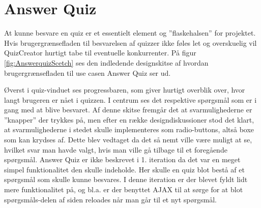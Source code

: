 \section{Answer Quiz}

At kunne besvare en quiz er et essentielt element og ''flaskehalsen'' for projektet. Hvis brugergrænsefladen til besvarelsen af quizzer ikke føles let og overskuelig vil QuizCreator hurtigt tabe til eventuelle konkurrenter. På figur \ref{fig:AnswerquizScetch} ses den indledende designskitse af hvordan brugergrænsefladen til use casen Answer Quiz ser ud.


Øverst i quiz-vinduet ses progressbaren, som giver hurtigt overblik over, hvor langt brugeren er nået i quizzen. I centrum ses det respektive spørgsmål som er i gang med at blive besvaret. Af denne skitse fremgår det at svarmulighederne er ''knapper'' der trykkes på, men efter en række designdiskussioner stod det klart, at svarmulighederne i stedet skulle implementeres som radio-buttons, altså boxe som kan krydses af. Dette blev vedtaget da det så nemt ville være muligt at se, hvilket svar man havde valgt, hvis man ville gå tilbage til et foregående spørgsmål.
Answer Quiz er ikke beskrevet i 1. iteration da det var en meget simpel funktionalitet den skulle indeholde. Her skulle en quiz blot bestå af et spørgsmål som skulle kunne besvares. 
I denne iteration er der blevet fyldt lidt mere funktionalitet på, og bl.a. er der benyttet AJAX til at sørge for at blot spørgsmåls-delen af siden reloades når man går til et nyt spørgsmål. 
